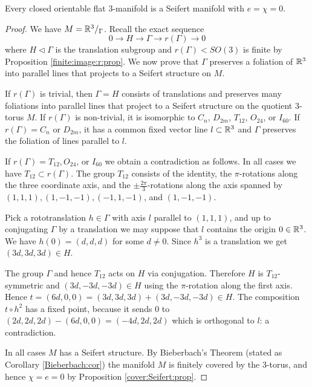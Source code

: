 \begin{prop} \label{flat:to:Seifert:prop}
Every closed orientable flat 3-manifold is a Seifert manifold with $e=\chi=0$.
\end{prop}
\begin{proof}
We have $M=\mathbb{R}^3/_\Gamma$. Recall the exact sequence
$$0 \longrightarrow H \longrightarrow \Gamma \longrightarrow r(\Gamma) \longrightarrow 0$$
where $H \triangleleft \Gamma$ is the translation subgroup and $r(\Gamma)<SO(3)$ is finite by Proposition \ref{finite:image:r:prop}. We now prove that $\Gamma$ preserves a foliation of $\mathbb{R}^3$ into parallel lines that projects to a Seifert structure on $M$.

If $r(\Gamma)$ is trivial, then $\Gamma = H$ consists of translations and preserves many foliations into parallel lines that project to a Seifert structure on the quotient 3-torus $M$. If $r(\Gamma)$ is non-trivial, it is isomorphic to $C_n$, $D_{2m}$, $T_{12}$, $O_{24}$, or $I_{60}$. If $r(\Gamma) = C_n$ or $D_{2m}$, it has a common fixed vector line $l\subset \mathbb{R}^3$ and $\Gamma$ preserves the foliation of lines parallel to $l$.

If $r(\Gamma) = T_{12}, O_{24}$, or $I_{60}$ we obtain a contradiction as follows. In all cases we have $T_{12}\subset r(\Gamma)$. The group $T_{12}$ consists of the identity, the $\pi$-rotations along the three coordinate axis, and the $\pm\frac {2\pi}3$-rotations along the axis spanned by $(1,1,1), (1,-1,-1), (-1,1,-1)$, and $(1,-1,-1)$. 

Pick a rototranslation $h\in \Gamma$ with axis $l$ parallel to $(1,1,1)$, and up to conjugating $\Gamma$ by a translation we may suppose that $l$ contains the origin $0\in\mathbb{R}^3$. We have $h(0) = (d,d,d)$ for some $d\neq 0$. Since $h^3$ is a translation we get $(3d,3d,3d) \in H$. 

The group $\Gamma$ and hence $T_{12}$ acts on $H$ via conjugation. Therefore $H$ is $T_{12}$-symmetric and $(3d,-3d,-3d)\in H$ using the $\pi$-rotation along the first axis. Hence $t=(6d,0,0) = (3d,3d,3d) + (3d,-3d,-3d) \in H$. The composition $t\circ h^2$ has a fixed point, because it sends $0$ to $(2d,2d,2d)-(6d,0,0) = (-4d,2d,2d)$ which is orthogonal to $l$: a contradiction.

In all cases $M$ has a Seifert structure. By Bieberbach's Theorem (stated as Corollary \ref{Bieberbach:cor}) the manifold $M$ is finitely covered by the 3-torus, and hence $\chi=e=0$ by Proposition \ref{cover:Seifert:prop}.
\end{proof}

